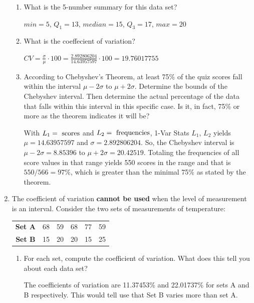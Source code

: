 \documentclass{article}
\newcommand{\answer}[1]{\color{white}#1}
\begin{document}
\begin{enumerate}
\begin{enumerate}
  \item What is the 5-number summary for this data set?
  
  {\answer{ $min = 5$, $Q_1 = 13$, $median=15$, $Q_3 = 17$, $max = 20$} }
  
  
  \item What is the coeffecient of variation?
  
  {\answer{ $CV = \frac{\sigma}{\mu} \cdot 100 = \frac{2.892806204}{14.63957597}\cdot 100 = 19.76017755$} }
  
	\item According to Chebyshev's Theorem, at least 75\% of the quiz scores fall within the interval $\mu -2\sigma$ to $\mu+2\sigma$. Determine the bounds of the Chebyshev interval. Then determine the actual percentage of the data that falls within this interval in this specific case. Is it, in fact, 75\% or more as the theorem indicates it will be?

	{\answer{With $L_1 = \textnormal{ scores}$ and $L_2 = \textnormal{ frequencies}$, 
	1-Var Stats $L_1$, $L_2$ yields $\mu = 14.63957597$ and $\sigma = 2.892806204$. 
	So, the Chebyshev interval is $\mu-2\sigma = 8.85396$ to $\mu +2\sigma =20.42519$. 
	Totaling the frequencies of all score values in that range yields 550 scores in the range and that is $550/566 = 97\%$, which is greater than the minimal 75\% as stated by the theorem.}} 
	
	\end{enumerate}

\newpage

\item The coefficient of variation \textbf{cannot be used} when the level of measurement is an interval. Consider the two sets of measurements of temperature:

\begin{center}
\begin{tabular}{c|ccccc}
\textbf{Set A} & 68 & 59 & 68 & 77 & 59 \\
\textbf{Set B} & 15 & 20 & 20 & 15 & 25 \\
\end{tabular}
\end{center}

    \begin{enumerate}
    \item For each set, compute the coefficient of variation. What does this tell you about each data set? 
    
    {\answer The coefficients of variation are 11.37453\% and 22.01737\% for sets A and B respectively. This would tell use that Set B varies more than set A.}
    

\end{enumerate}
\end{enumerate}
\end{document}
